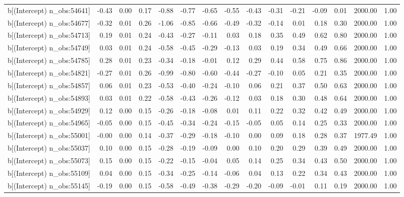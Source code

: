 \begin{table}[ht]
\begin{tabular}{rrrrrrrrrrrrrrr}
  b[(Intercept) n\_obs:54641] & -0.43 & 0.00 & 0.17 & -0.88 & -0.77 & -0.65 & -0.55 & -0.43 & -0.31 & -0.21 & -0.09 & 0.01 & 2000.00 & 1.00 \\ 
  b[(Intercept) n\_obs:54677] & -0.32 & 0.01 & 0.26 & -1.06 & -0.85 & -0.66 & -0.49 & -0.32 & -0.14 & 0.01 & 0.18 & 0.30 & 2000.00 & 1.00 \\ 
  b[(Intercept) n\_obs:54713] & 0.19 & 0.01 & 0.24 & -0.43 & -0.27 & -0.11 & 0.03 & 0.18 & 0.35 & 0.49 & 0.62 & 0.80 & 2000.00 & 1.00 \\ 
  b[(Intercept) n\_obs:54749] & 0.03 & 0.01 & 0.24 & -0.58 & -0.45 & -0.29 & -0.13 & 0.03 & 0.19 & 0.34 & 0.49 & 0.66 & 2000.00 & 1.00 \\ 
  b[(Intercept) n\_obs:54785] & 0.28 & 0.01 & 0.23 & -0.34 & -0.18 & -0.01 & 0.12 & 0.29 & 0.44 & 0.58 & 0.75 & 0.86 & 2000.00 & 1.00 \\ 
  b[(Intercept) n\_obs:54821] & -0.27 & 0.01 & 0.26 & -0.99 & -0.80 & -0.60 & -0.44 & -0.27 & -0.10 & 0.05 & 0.21 & 0.35 & 2000.00 & 1.00 \\ 
  b[(Intercept) n\_obs:54857] & 0.06 & 0.01 & 0.23 & -0.53 & -0.40 & -0.24 & -0.10 & 0.06 & 0.21 & 0.37 & 0.50 & 0.63 & 2000.00 & 1.00 \\ 
  b[(Intercept) n\_obs:54893] & 0.03 & 0.01 & 0.22 & -0.58 & -0.43 & -0.26 & -0.12 & 0.03 & 0.18 & 0.30 & 0.48 & 0.64 & 2000.00 & 1.00 \\ 
  b[(Intercept) n\_obs:54929] & 0.12 & 0.00 & 0.15 & -0.26 & -0.18 & -0.08 & 0.01 & 0.11 & 0.22 & 0.32 & 0.42 & 0.49 & 2000.00 & 1.00 \\ 
  b[(Intercept) n\_obs:54965] & -0.05 & 0.00 & 0.15 & -0.45 & -0.34 & -0.24 & -0.15 & -0.05 & 0.05 & 0.14 & 0.25 & 0.33 & 2000.00 & 1.00 \\ 
  b[(Intercept) n\_obs:55001] & -0.00 & 0.00 & 0.14 & -0.37 & -0.29 & -0.18 & -0.10 & 0.00 & 0.09 & 0.18 & 0.28 & 0.37 & 1977.49 & 1.00 \\ 
  b[(Intercept) n\_obs:55037] & 0.10 & 0.00 & 0.15 & -0.28 & -0.19 & -0.09 & 0.00 & 0.10 & 0.20 & 0.29 & 0.39 & 0.49 & 2000.00 & 1.00 \\ 
  b[(Intercept) n\_obs:55073] & 0.15 & 0.00 & 0.15 & -0.22 & -0.15 & -0.04 & 0.05 & 0.14 & 0.25 & 0.34 & 0.43 & 0.50 & 2000.00 & 1.00 \\ 
  b[(Intercept) n\_obs:55109] & 0.04 & 0.00 & 0.15 & -0.34 & -0.25 & -0.14 & -0.06 & 0.04 & 0.13 & 0.22 & 0.34 & 0.43 & 2000.00 & 1.00 \\ 
  b[(Intercept) n\_obs:55145] & -0.19 & 0.00 & 0.15 & -0.58 & -0.49 & -0.38 & -0.29 & -0.20 & -0.09 & -0.01 & 0.11 & 0.19 & 2000.00 & 1.00 \\ 

\end{tabular}
\end{table}
